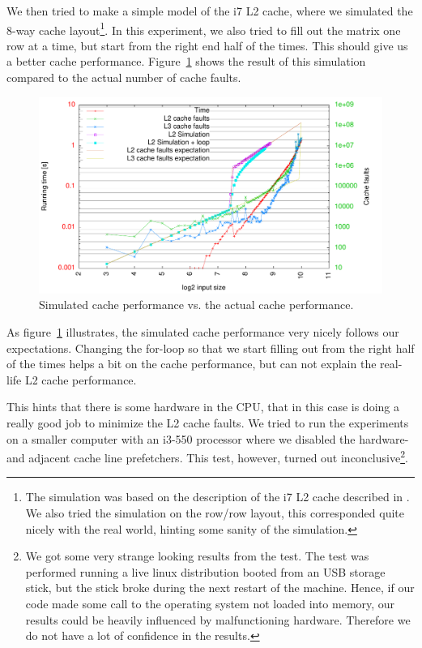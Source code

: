 We then tried to make a simple model of the i7 L2 cache, where we
simulated the 8-way cache layout\footnote{The simulation was based on
  the description of the i7 L2 cache described in \cite[p. 117 - 121]{Hanne}. We also tried the simulation on the row/row layout, this
  corresponded quite nicely with the real world, hinting some sanity
  of the simulation.}. In this experiment, we also tried to fill out
the matrix one row at a time, but start from the right end half of the
times. This should give us a better cache
performance. Figure~\ref{fig:rowcol_simulation} shows the result of
this simulation compared to the actual number of cache faults.
\begin{figure}[h!]
  \centering
  \includegraphics[width=\textwidth]{plots/rowcol_simulation}
  \caption{Simulated cache performance vs. the actual cache performance.}
  \label{fig:rowcol_simulation}
\end{figure}

As figure~\ref{fig:rowcol_simulation} illustrates, the simulated cache
performance very nicely follows our expectations. Changing the
for-loop so that we start filling out from the right half of the times
helps a bit on the cache performance, but can not explain the
real-life L2 cache performance.

This hints that there is some hardware in the CPU, that in this case
is doing a really good job to minimize the L2 cache faults. We tried
to run the experiments on a smaller computer with an i3-550 processor
where we disabled the hardware- and adjacent cache line
prefetchers. This test, however, turned out inconclusive\footnote{We
  got some very strange looking results from the test. The test was
  performed running a live linux distribution booted from an USB
  storage stick, but the stick broke during the next restart of the
  machine. Hence, if our code made some call to the operating system
  not loaded into memory, our results could be heavily influenced by
  malfunctioning hardware. Therefore we do not have a lot of
  confidence in the results.}.

